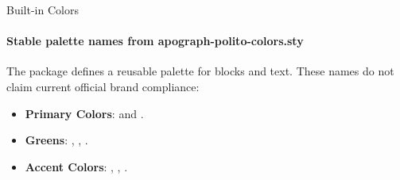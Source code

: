 \apographFootlineColor{}
\begin{frame}[fragile]{Built-in Colors}
\framesubtitle{Stable palette names from apograph-polito-colors.sty}
The package defines a reusable palette for blocks and text. These names do not
claim current official brand compliance:
\begin{itemize}
    \item \textbf{Primary Colors}:
     and .
    \item \textbf{Greens}:
    , , .
    \item \textbf{Accent Colors}:
    , , .
\end{itemize}
\end{frame}
